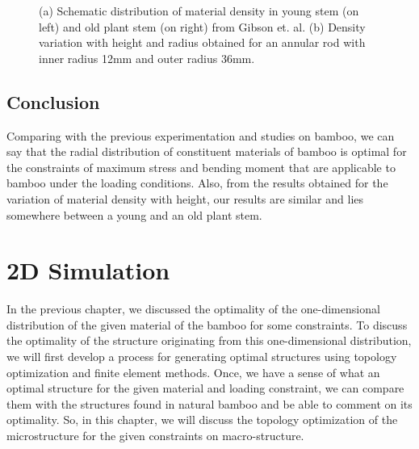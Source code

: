 \documentclass[openright,twoside]{iitkthesis}
\begin{document}
\begin{figure}[H]
\begin{center}
{     }
	\label{fig:height}
	\caption{(a) Schematic distribution of material density in young stem (on left) and old plant stem (on right) from Gibson et. al. \cite{gibson1995mechanical} (b) Density variation with height and radius obtained for an annular rod with inner radius 12mm and outer radius 36mm.}
\end{center}
\end{figure}

\section{Conclusion}
Comparing with the previous experimentation and studies on bamboo, we can say that the radial distribution of constituent materials of bamboo is optimal for the constraints of maximum stress and bending moment that are applicable to bamboo under the loading conditions. Also, from the results obtained for the variation of material density with height, our results are similar and lies somewhere between a young and an old plant stem. 

\chapter{2D Simulation}
In the previous chapter, we discussed the optimality of the one-dimensional distribution of the given material of the bamboo for some constraints. To discuss the optimality of the structure originating from this one-dimensional distribution, we will first develop a process for generating optimal structures using topology optimization and finite element methods. Once, we have a sense of what an optimal structure for the given material and loading constraint, we can compare them with the structures found in natural bamboo and be able to comment on its optimality. So, in this chapter, we will discuss the topology optimization of the microstructure for the given constraints on macro-structure.
\\
\end{document}
